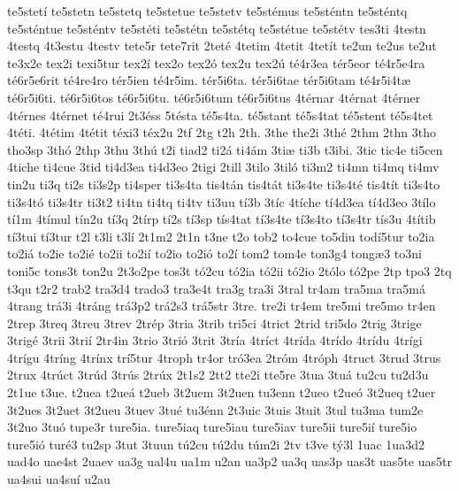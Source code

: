 {te5stet^^ed
te5stetn
te5stetq
te5stetue
te5stetv
te5st^^e9mus
te5st^^e9ntn
te5st^^e9ntq
te5st^^e9ntue
te5st^^e9ntv
te5st^^e9ti
te5st^^e9tn
te5st^^e9tq
te5st^^e9tue
te5st^^e9tv
tes3ti
4testn
4testq
4t3estu
4testv
tete5r
tete7rit
2tet^^e9
4tetim
4tetit
4tet^^edt
te2un
te2us
te2ut
te3x2e
tex2i
texi5tur
tex2^^ed
tex2o
tex2^^f3
tex2u
tex2^^fa
t^^e94r3ea
t^^e9r5eor
t^^e94r5e4ra
t^^e96r5e6rit
t^^e94re4ro
t^^e9r5ien
t^^e94r5im.
t^^e9r5i6ta.
t^^e9r5i6tae
t^^e9r5i6tam
t^^e94r5i4t^^e6
t^^e96r5i6ti.
t^^e96r5i6tos
t^^e96r5i6tu.
t^^e96r5i6tum
t^^e96r5i6tus
4t^^e9rnar
4t^^e9rnat
4t^^e9rner
4t^^e9rnes
4t^^e9rnet
t^^e94rui
2t3^^e9ss
5t^^e9sta
t^^e95s4ta.
t^^e95stant
t^^e95s4tat
t^^e95stent
t^^e95s4tet
4t^^e9ti.
4t^^e9tim
4t^^e9tit
t^^e9xi3
t^^e9x2u
2tf
2tg
t2h
2th.
3the
the2i
3th^^e9
2thm
2thn
3tho
tho3sp
3th^^f3
2thp
3thu
3th^^fa
t2i
tiad2
ti2^^e1
ti4^^e1m
3ti^^e6
ti3b
t3ibi.
3tic
tic4e
ti5cen
4tiche
ti4cue
3tid
ti4d3ea
ti4d3eo
2tigi
2till
3tilo
3til^^f3
ti3m2
ti4mn
ti4mq
ti4mv
tin2u
ti3q
ti2s
ti3s2p
ti4sper
ti3s4ta
tis4t^^e1n
tis4t^^e1t
ti3s4te
ti3s4t^^e9
tis4t^^edt
ti3s4to
ti3s4t^^f3
ti3s4tr
ti3t2
ti4tn
ti4tq
ti4tv
ti3uu
t^^ed3b
3t^^edc
4t^^edche
t^^ed4d3ea
t^^ed4d3eo
3t^^edlo
t^^ed1m
4t^^edmul
t^^edn2u
t^^ed3q
2t^^edrp
t^^ed2s
t^^ed3sp
t^^eds4tat
t^^ed3s4te
t^^ed3s4to
t^^ed3s4tr
t^^eds3u
4t^^edtib
t^^ed3tui
t^^ed3tur
t2l
t3li
t3l^^ed
2t1m2
2t1n
t3ne
t2o
tob2
to4cue
to5diu
tod^^ed5tur
to2ia
to2i^^e1
to2ie
to2i^^e9
to2ii
to2i^^ed
to2io
to2i^^f3
to2^^ed
tom2
tom4e
ton3g4
tong^^e63
to3ni
toni5c
tons3t
ton2u
2t3o2pe
tos3t
t^^f32cu
t^^f32ia
t^^f32ii
t^^f32io
2t^^f3lo
t^^f32pe
2tp
tpo3
2tq
t3qu
t2r2
trab2
tra3d4
trado3
tra3e4t
tra3g
tra3i
3tral
tr4am
tra5ma
tra5m^^e1
4trang
tr^^e13i
4tr^^e1ng
tr^^e13p2
tr^^e12s3
tr^^e15str
3tre.
tre2i
tr4em
tre5mi
tre5mo
tr4en
2trep
3treq
3treu
3trev
2tr^^e9p
3tria
3trib
tri5ci
4trict
2trid
tri5do
2trig
3trige
3trig^^e9
3trii
3tri^^ed
2tr4in
3trio
3tri^^f3
3trit
3tr^^eda
4tr^^edct
4tr^^edda
4tr^^eddo
4tr^^eddu
4tr^^edgi
4tr^^edgu
4tr^^edng
4tr^^ednx
tr^^ed5tur
4troph
tr4or
tr^^f33ea
2tr^^f3m
4tr^^f3ph
4truct
3trud
3trus
2trux
4tr^^fact
3tr^^fad
3tr^^fas
2tr^^fax
2t1s2
2tt2
tte2i
tte5re
3tua
3tu^^e1
tu2cu
tu2d3u
2t1ue
t3ue.
t2uea
t2ue^^e1
t2ueb
3t2uem
3t2uen
tu3enn
t2ueo
t2ue^^f3
3t2ueq
t2uer
3t2ues
3t2uet
3t2ueu
3tuev
3tu^^e9
tu3^^e9nn
2t3uic
3tuis
3tuit
3tul
tu3ma
tum2e
3t2uo
3tu^^f3
tupe3r
ture5ia.
ture5iaq
ture5iau
ture5iav
ture5ii
ture5i^^ed
ture5io
ture5i^^f3
tur^^e93
tu2sp
3tut
3tuun
t^^fa2cu
t^^fa2du
t^^fam2i
2tv
t3ve
t^^fd3l
1uac
1ua3d2
uad4o
uae4st
2uaev
ua3g
ual4u
ua1m
u2an
ua3p2
ua3q
uas3p
uas3t
uas5te
uas5tr
ua4sui
ua4su^^ed
u2au
}
